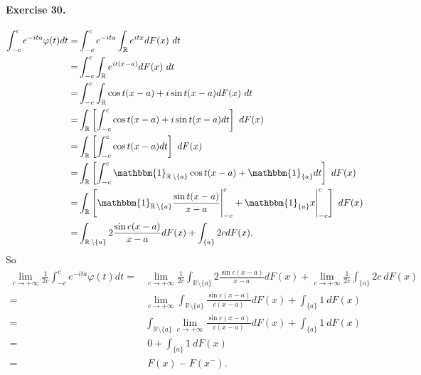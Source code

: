 \documentclass[12pt,a4paper]{report}
\theoremstyle{definition}
\theoremstyle{num.custom-title}
\DeclareMathOperator{\sm}{\setminus}
\newcommand{\R}{\mathbb{R}}
\renewcommand{\phi}{\varphi}
\renewcommand{\1}{\mathbbm{1}}
\begin{document}
\paragraph{Exercise 30.} 
\begin{align*}
\int_{-c}^c e^{-ita} \phi(t) dt
=& \int_{-c}^c e^{-ita} \int_\R e^{itx} dF(x) \ dt \\
=& \int_{-c}^c \int_\R e^{it(x-a)} dF(x) \ dt \\
=& \int_{-c}^c \int_\R \cos t(x-a) + i\sin t(x-a) dF(x) \ dt \\
=& \int_\R \left[ \int_{-c}^c \cos t(x-a) + i\sin t(x-a) dt \right] \ dF(x) \\
=& \int_\R \left[ \int_{-c}^c \cos t(x-a) dt \right] \ dF(x) \\
=& \int_\R \left[ \int_{-c}^c \1_{\R \sm \{a\}} \cos t(x-a) + \1_{\{a\}} dt \right] \ dF(x) \\
=& \int_\R \left[ \1_{\R \sm \{a\}} \frac{\sin t(x-a)}{x-a} \Bigg|_{-c}^c + \1_{\{a\}} x \Bigg|_{-c}^c \right] \ dF(x) \\
=& \int_{\R \sm \{a\}} 2\frac{\sin c(x-a)}{x-a} dF(x) + \int_{\{a\}} 2c dF(x). 
\end{align*}
So
\begin{align*}
\lim_{c \to +\infty} \frac{1}{2c} \int_{-c}^c e^{-ita} \phi(t) dt
=& \lim_{c \to +\infty} \frac{1}{2c} \int_{\R \sm \{a\}} 2\frac{\sin c(x-a)}{x-a} dF(x) + \lim_{c \to +\infty} \frac{1}{2c} \int_{\{a\}} 2c \ dF(x) \\
=& \lim_{c \to +\infty} \int_{\R \sm \{a\}} \frac{\sin c(x-a)}{c(x-a)} dF(x) + \int_{\{a\}} 1 \ dF(x) \\
=& \int_{\R \sm \{a\}} \lim_{c \to +\infty} \frac{\sin c(x-a)}{c(x-a)} dF(x) + \int_{\{a\}} 1 \ dF(x) \\
=& \ 0 + \int_{\{a\}} 1 \ dF(x) \\
=& \ F(x) - F(x^-).
\end{align*}
\end{document}
